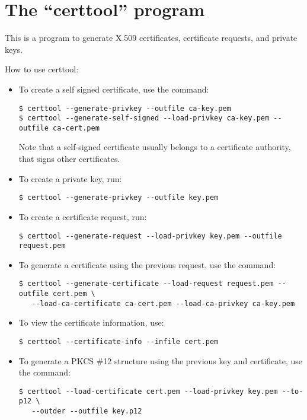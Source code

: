 \section{The ``certtool'' program}

This is a program to generate X.509 certificates, certificate requests, and
private keys.

How to use certtool:

\begin{itemize}

\item To create a self signed certificate, use the command:
\begin{verbatim}
$ certtool --generate-privkey --outfile ca-key.pem
$ certtool --generate-self-signed --load-privkey ca-key.pem --outfile ca-cert.pem
\end{verbatim}
Note that a self-signed certificate usually belongs to a certificate
authority, that signs other certificates.

\item To create a private key, run:
\begin{verbatim}
$ certtool --generate-privkey --outfile key.pem
\end{verbatim}

\item To create a certificate request, run:
\begin{verbatim}
$ certtool --generate-request --load-privkey key.pem --outfile request.pem
\end{verbatim}

\item To generate a certificate using the previous request, use the command:
\begin{verbatim}
$ certtool --generate-certificate --load-request request.pem --outfile cert.pem \
   --load-ca-certificate ca-cert.pem --load-ca-privkey ca-key.pem
\end{verbatim}

\item To view the certificate information, use:
\begin{verbatim}
$ certtool --certificate-info --infile cert.pem
\end{verbatim}

\item To generate a PKCS \#12 structure using the previous key and certificate, use the command:
\begin{verbatim}
$ certtool --load-certificate cert.pem --load-privkey key.pem --to-p12 \
   --outder --outfile key.p12
\end{verbatim}


\end{itemize}

